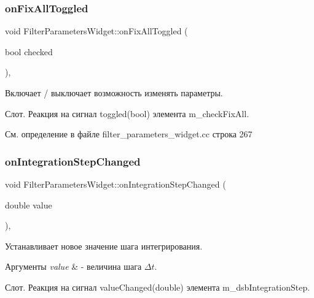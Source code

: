 \hypertarget{class_filter_parameters_widget_a6d01e0b6bdb2b38f03a6935fac62a31c}{}\label{class_filter_parameters_widget_a6d01e0b6bdb2b38f03a6935fac62a31c} 
\subsubsection{\texorpdfstring{on\+Fix\+All\+Toggled}{onFixAllToggled}}
{\footnotesize\ttfamily void Filter\+Parameters\+Widget\+::on\+Fix\+All\+Toggled (\begin{DoxyParamCaption}\item[{bool}]{checked }\end{DoxyParamCaption})\hspace{0.3cm}{\ttfamily [private]}, {\ttfamily [slot]}}



Включает / выключает возможность изменять параметры. 

Слот. Реакция на сигнал toggled(bool) элемента m\+\_\+check\+Fix\+All. 

См. определение в файле filter\+\_\+parameters\+\_\+widget.\+cc строка 267

\hypertarget{class_filter_parameters_widget_a8461deaa884f5615241d6730b73f9d7b}{}\label{class_filter_parameters_widget_a8461deaa884f5615241d6730b73f9d7b} 
\subsubsection{\texorpdfstring{on\+Integration\+Step\+Changed}{onIntegrationStepChanged}}
{\footnotesize\ttfamily void Filter\+Parameters\+Widget\+::on\+Integration\+Step\+Changed (\begin{DoxyParamCaption}\item[{double}]{value }\end{DoxyParamCaption})\hspace{0.3cm}{\ttfamily [private]}, {\ttfamily [slot]}}



Устанавливает новое значение шага интегрирования. 


\begin{DoxyParams}{Аргументы}
{\em value} & -\/ величина шага $\Delta t$.\\
\hline
\end{DoxyParams}
Слот. Реакция на сигнал value\+Changed(double) элемента m\+\_\+dsb\+Integration\+Step. 

